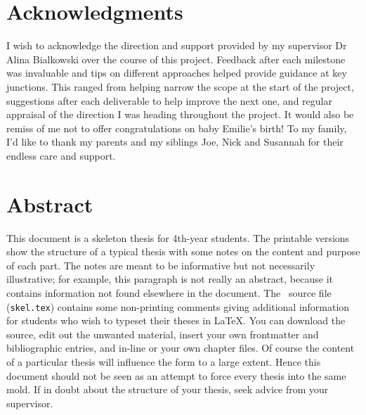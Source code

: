 \documentclass[12pt,openany,a4paper]{book}
\begin{document}
\frontmatter



\cleardoublepage



\cleardoublepage


\chapter{Acknowledgments}

I wish to acknowledge the direction and support provided by my supervisor Dr Alina Bialkowski over the course of this project. Feedback after each milestone was invaluable and tips on different approaches helped provide guidance at key junctions. This ranged from helping narrow the scope at the start of the project, suggestions after each deliverable to help improve the next one, and regular appraisal of the direction I was heading throughout the project. It would also be remiss of me not to offer congratulations on baby Emilie's birth! To my family, I'd like to thank my parents and my siblings Joe, Nick and Susannah for their endless care and support.
\cleardoublepage

\chapter{Abstract}

This document is a skeleton thesis for 4th-year students.  The
printable versions show the structure of a typical thesis with some notes on the content
and purpose of each part.  The notes are meant to be informative but
not necessarily illustrative; for example, this paragraph is not
really an abstract, because it contains information not found
elsewhere in the document.  The \LaTeXe\ source file
(\texttt{skel.tex}) contains some non-printing comments giving
additional information for students who wish to typeset their theses
in \LaTeX.  You can download the source, edit out the unwanted
material, insert your own frontmatter and bibliographic entries, and
in-line or \verb++ your own chapter files.  Of course the
content of a particular thesis will influence the form to a large
extent.  Hence this document should not be seen as an attempt to force every thesis into the same mold.  If in doubt about the structure of your thesis, seek advice from your supervisor.
\end{document}
